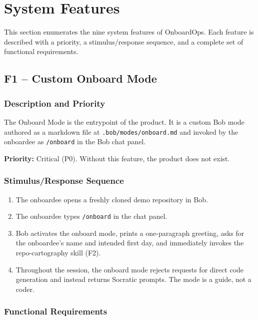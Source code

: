 \documentclass[11pt,letterpaper]{article}
\begin{document}
\section{System Features}

This section enumerates the nine system features of OnboardOps. Each feature is described with a priority, a stimulus/response sequence, and a complete set of functional requirements.

\subsection{F1 -- Custom Onboard Mode}

\subsubsection{Description and Priority}

The Onboard Mode is the entrypoint of the product. It is a custom Bob mode authored as a markdown file at \texttt{.bob/modes/onboard.md} and invoked by the onboardee as \texttt{/onboard} in the Bob chat panel.

\textbf{Priority:} Critical (P0). Without this feature, the product does not exist.

\subsubsection{Stimulus/Response Sequence}

\begin{enumerate}
  \item The onboardee opens a freshly cloned demo repository in Bob.
  \item The onboardee types \texttt{/onboard} in the chat panel.
  \item Bob activates the onboard mode, prints a one-paragraph greeting, asks for the onboardee's name and intended first day, and immediately invokes the repo-cartography skill (F2).
  \item Throughout the session, the onboard mode rejects requests for direct code generation and instead returns Socratic prompts. The mode is a guide, not a coder.
\end{enumerate}

\subsubsection{Functional Requirements}
\end{document}
